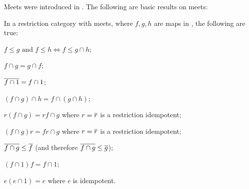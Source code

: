     Meets were introduced in \cite{cockett-guo-hofstra-2012:range2}.
    The following are basic results on meets:

    \begin{lemma}
      \label{lem:properties_of_meets_in_restriction_categories}
      In a restriction category \X with meets, where $f, g, h$ are maps in
      \X, the following are true:
      \bproofenum
        \item $f\le g \text{ and } f \le h \iff f \le g\cap h$; 
            \label{lemsub:properties_of_meets_one}
        \item $f\cap g = g \cap f$;\label{lemsub:properties_of_meets_two}
        \item $\overline{f\cap 1} = f \cap 1$;\label{lemsub:properties_of_meets_three}
        \item $(f \cap g) \cap h = f \cap (g \cap h)$;
        \item $r(f\cap g) = r f \cap g$ where $r=\overline{r}$ is a restriction idempotent;
        \item $(f\cap g)r = f r \cap g$ where $r=\overline{r}$ is a restriction idempotent;
        \item $\overline{f\cap g} \le \overline{f}$ (and therefore $\overline{f\cap g} \le \overline{g}$);
        \item $ (f \cap 1) f = f \cap 1$;
        \item $ e(e \cap 1) = e$ where $e$ is idempotent.
      \eproofenum
    \end{lemma}

